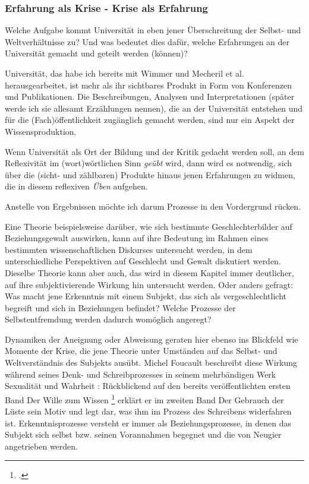 \subsubsection{Erfahrung als Krise - Krise als Erfahrung}

Welche Aufgabe kommt Universität in eben jener Überschreitung der Selbst- und
Weltverhältnisse zu? Und was bedeutet dies dafür, welche Erfahrungen an der
Universität gemacht und geteilt werden (können)? 

Universität, das habe ich
bereits mit Wimmer und Mecheril et al. herausgearbeitet, ist mehr als ihr
sichtbares Produkt in Form von Konferenzen und Publikationen. Die
Beschreibungen, Analysen und Interpretationen (später werde ich sie allesamt
Erzählungen nennen), die an der Universität entstehen und für die
(Fach)öffentlichkeit zugänglich gemacht werden, sind nur ein Aspekt der
Wissensproduktion. 

Wenn Universität als Ort der Bildung und der Kritik gedacht
werden soll, an dem Reflexivität im (wort)wörtlichen Sinn \textit{geübt} wird, dann wird
es notwendig, sich über die (sicht- und zählbaren) Produkte hinaus jenen
Erfahrungen zu widmen, die in diesem reflexiven \textit{Üben} aufgehen.  

Anstelle von
Ergebnissen möchte ich darum Prozesse in den Vordergrund rücken.  

Eine Theorie
beispielsweise darüber, wie sich bestimmte Geschlechterbilder auf
Beziehungsgewalt auswirken, kann auf ihre Bedeutung im Rahmen eines bestimmten
wissenschaftlichen Diskurses untersucht werden, in dem unterschiedliche
Perspektiven auf Geschlecht und Gewalt diskutiert werden. Dieselbe Theorie kann
aber auch, das wird in diesem Kapitel immer deutlicher, auf ihre
subjektivierende Wirkung hin untersucht werden. Oder anders gefragt:\\
Was macht
jene Erkenntnis mit einem Subjekt, das sich als vergeschlechtlicht begreift und
sich in Beziehungen befindet? Welche Prozesse der Selbstentfremdung werden
dadurch womöglich angeregt?  

Dynamiken der Aneignung oder Abweisung geraten
hier ebenso ins Blickfeld wie Momente der Krise, die jene Theorie unter
Umständen auf das Selbst- und Weltverständnis des Subjekts ausübt.  Michel
Foucault beschreibt diese Wirkung während seines Denk- und Schreibprozesses in
seinem mehrbändigen Werk \glqq Sexualität und Wahrheit\grqq\footnotemark
{}: Rückblickend auf den
bereits veröffentlichten ersten Band \glqq Der Wille zum Wissen \grqq
\footnotemark \footcitetext{foucault} erklärt er im
zweiten Band \glqq Der Gebrauch der Lüste\grqq\footnotemark
{} sein Motiv und legt dar, was ihm im
Prozess des Schreibens widerfahren ist. Erkenntnisprozesse versteht er immer als Beziehungsprozesse, in denen das Subjekt sich selbst bzw. seinen Vorannahmen begegnet und die von Neugier angetrieben werden. 

